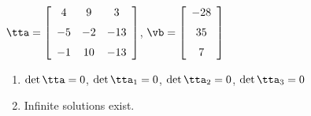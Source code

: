 {$\tta = \left[ \begin {array}{ccc} 4&9&3\\\noalign{\medskip}-5&-2&-13
\\\noalign{\medskip}-1&10&-13\end {array} \right] $,
 \quad
$\vb = \left[ \begin {array}{c} -28\\\noalign{\medskip}35
\\\noalign{\medskip}7\end {array} \right]$}
{\begin{enumerate}
\item	$\det{\tta} = 0$, $\det{\tta_1} = 0$, $\det{\tta_2} = 0$, $\det{\tta_3} = 0$
\item Infinite solutions exist.
\end{enumerate}
}

 


